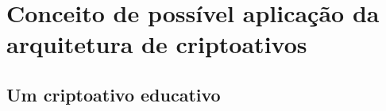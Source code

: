 \chapter{Conceito de possível aplicação da arquitetura de criptoativos}

\section*{Um criptoativo educativo}
\label{sec:educativo}









